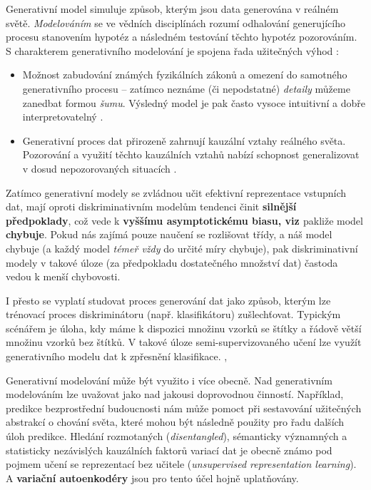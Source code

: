 Generativní model simuluje způsob, kterým jsou data generována v reálném světě.
\emph{Modelováním} se ve vědních disciplínách rozumí odhalování generujícího procesu stanovením hypotéz a následném testování těchto hypotéz pozorováním. 
S charakterem generativního modelování je spojena řada užitečných výhod \cite{Goodfellow2016}:

\begin{itemize}
    \item Možnost zabudování známých fyzikálních zákonů a omezení do samotného generativního procesu – zatímco neznáme (či nepodstatné) \emph{detaily} můžeme zanedbat formou \emph{šumu}. Výsledný model je pak často vysoce intuitivní a dobře interpretovatelný \cite{Goodfellow2016}.
    \item Generativní proces dat přirozeně zahrnují kauzální vztahy reálného světa. Pozorování a využití těchto kauzálních vztahů nabízí schopnost generalizovat v dosud nepozorovaných situacích \cite{Goodfellow2016}.
\end{itemize}

Zatímco generativní modely se zvládnou učit efektivní reprezentace vstupních dat, mají oproti diskriminativním modelům tendenci činit \textbf{silnější předpoklady}, což vede k \textbf{vyššímu asymptotickému biasu, viz \textcite{Tadic2017}} pakliže model \textbf{chybuje}. \cite{Banerjee2007}
Pokud nás zajímá pouze naučení se rozlišovat třídy, a náš model chybuje (a každý model \emph{témeř vždy} do určité míry chybuje), pak diskriminativní modely v takové úloze (za předpokladu dostatečného množství dat) častoda vedou k menší chybovosti.  \cite{Goodfellow2016}

I přesto se vyplatí studovat proces generování dat jako způsob, kterým lze trénovací proces diskriminátoru (např. klasifikátoru) zušlechťovat.
Typickým scénářem je úloha, kdy máme k dispozici množinu vzorků se štítky a řádově větší množinu vzorků bez štítků.
V takové úloze semi-supervizovaného učení lze využít generativního modelu dat k zpřesnění klasifikace. \cite{Kingma2014}, \cite{Soenderby2016}

Generativní modelování může být využito i více obecně. Nad generativním modelováním lze uvažovat jako nad jakousi doprovodnou činností.
Například, predikce bezprostřední budoucnosti nám může pomoct při sestavování užitečných abstrakcí o chování světa, které mohou být následně použity pro řadu dalších úloh predikce.
Hledání rozmotaných (\emph{disentangled}), sémanticky významných a statisticky nezávislých kauzálních faktorů variací dat je obecně známo pod pojmem učení se reprezentací bez učitele (\emph{unsupervised representation learning}).
A \textbf{variační autoenkodéry} jsou pro tento účel hojně uplatňovány. \cite{Goodfellow2016}

